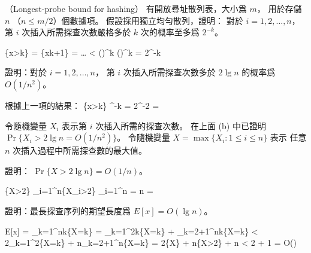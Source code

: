 \startPROBLEM
（Longest-probe bound for hashing）
有開放尋址散列表，大小爲 $m$，
用於存儲 $n$ （$n\le m/2$）個數據項。
\startigBase[a]\startitem
假設採用獨立均勻散列，證明：
對於 $i=1,2,\ldots,n$，
第 $i$ 次插入所需探查次數嚴格多於 $k$ 次的概率至多爲 $2^{-k}$。
\stopitem\stopigBase

\startANSWER
\startsplitformula\startmathalignment
\NC \Pr\{x>k\}
    \NC = \Pr\{x\ge k+1\} \NR
\NC \NC =  \cdot {}
          \cdot \ldots \cdot
	   \qquad {} \NR
\NC \NC < ()^k \NR
\NC \NC \le ()^k \NR
\NC \NC = 2^{-k} \NR
\stopmathalignment\stopsplitformula
\stopANSWER

\startigBase[continue]\startitem
證明：對於 $i=1,2,\ldots,n$，
第 $i$ 次插入所需探查次數多於 $2\lg{n}$ 的概率爲 $O(1/n^2)$。
\stopitem\stopigBase

\startANSWER
根據上一項的結果：
\startformula
\Pr\{x>k\} ^{-k} = 2^{-2} = 
\stopformula
\stopANSWER

令隨機變量 $X_i$ 表示第 $i$ 次插入所需的探查次數。
在上面 (b) 中已證明 $\Pr\{X_i>2\lg{n} = O(1/n^2)\}$。
令隨機變量 $X=\max\{X_i: 1\le i\le n\}$ 表示
任意 $n$ 次插入過程中所需探查數的最大值。

\startigBase[continue]\startitem
證明： $\Pr\{X>2\lg{n}\} = O(1/n)$。
\stopitem\stopigBase

\startANSWER
\startformula
\Pr\{X>2\}
  \le \sum_{i=1}^{n}\Pr\{X_i>2\}
  \le \sum_{i=1}^{n}
  = n \cdot {}
  = 
\stopformula
\stopANSWER

\startigBase[continue]\startitem
證明：最長探查序列的期望長度爲 $E[x]=O(\lg{n})$。
\stopitem\stopigBase

\startANSWER
\startsplitformula\startmathalignment
\NC E[x]
    \NC = \sum_{k=1}^{n}k\Pr\{X=k\} \NR
\NC \NC = \sum_{k=1}^{2}k\Pr\{X=k\} + \sum_{k=2+1}^{n}k\Pr\{X=k\} \NR
\NC \NC < 2\sum_{k=1}^{2}\Pr\{X=k\} + n\sum_{k=2+1}^{n}\Pr\{X=k\} \NR
\NC \NC = 2\Pr\{X\} + n\Pr\{X>2\} \NR
{}
\NC \NC {} + n \cdot {} \NR
\NC \NC < 2 + 1 \NR
\NC \NC = O() \NR
\stopmathalignment\stopsplitformula
\stopANSWER

\stopPROBLEM
